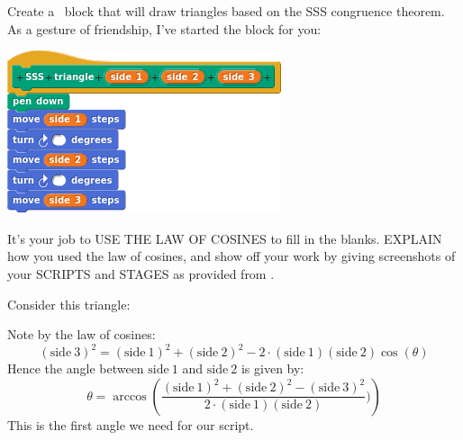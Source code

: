 \documentclass[noauthor,nooutcomes,12pt,handout]{ximera}
\begin{document}
\begin{question}
  Create a \snap\ block that will draw triangles based on the SSS
  congruence theorem.  As a gesture of friendship, I've started the
  block for you:
  \begin{center}
    \includegraphics{sssBlockBLANK}
  \end{center}
  It's your job to USE THE LAW OF COSINES to fill in the
  blanks. EXPLAIN how you used the law of cosines, and show off your
  work by giving screenshots of your SCRIPTS and STAGES as provided
  from \snap.
  \begin{freeResponse}
    Consider this triangle:
    \begin{center}
      \end{center}


    
    Note by the law of cosines:
    \[
    (\mathrm{side~3})^2 = (\mathrm{side~1})^2 + (\mathrm{side~2})^2 - 2\cdot (\mathrm{side~1})(\mathrm{side~2})\cos(\theta)
    \]
    Hence the angle between $\mathrm{side~1}$ and $\mathrm{side~2}$ is given by:
    \[
    \theta = \arccos\left(\frac{(\mathrm{side~1})^2 + (\mathrm{side~2})^2- (\mathrm{side~3})^2}{2\cdot (\mathrm{side~1})(\mathrm{side~2})})\right) 
    \]
    This is the first angle we need for our script.


\end{freeResponse}
\end{question}
\end{document}
